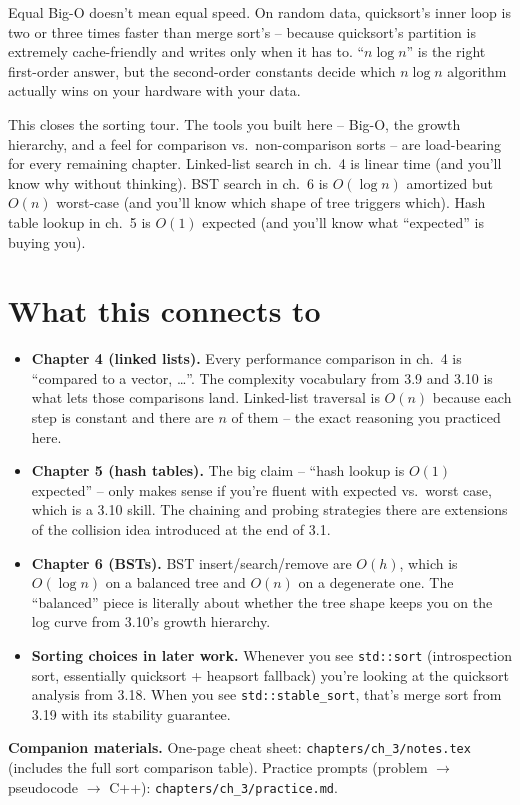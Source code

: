 \documentclass[11pt]{article}
\begin{document}
\begin{warnbox}
Equal Big-O doesn't mean equal speed. On random data, quicksort's
inner loop is two or three times faster than merge sort's --
because quicksort's partition is extremely cache-friendly and
writes only when it has to. ``$n \log n$'' is the right first-order
answer, but the second-order constants decide which $n \log n$
algorithm actually wins on your hardware with your data.
\end{warnbox}

\begin{ideabox}
This closes the sorting tour. The tools you built here -- Big-O, the
growth hierarchy, and a feel for comparison vs.\ non-comparison sorts --
are load-bearing for every remaining chapter. Linked-list search in
ch.~4 is linear time (and you'll know why without thinking). BST search
in ch.~6 is $O(\log n)$ amortized but $O(n)$ worst-case (and you'll know
which shape of tree triggers which). Hash table lookup in ch.~5 is $O(1)$
expected (and you'll know what ``expected'' is buying you).
\end{ideabox}

\section*{What this connects to}

\begin{notebox}
\begin{itemize}
    \item \textbf{Chapter 4 (linked lists).} Every performance comparison
    in ch.~4 is ``compared to a vector, \ldots''. The complexity
    vocabulary from 3.9 and 3.10 is what lets those comparisons land.
    Linked-list traversal is $O(n)$ because each step is constant and
    there are $n$ of them -- the exact reasoning you practiced here.
    \item \textbf{Chapter 5 (hash tables).} The big claim -- ``hash
    lookup is $O(1)$ expected'' -- only makes sense if you're fluent
    with expected vs.\ worst case, which is a 3.10 skill. The chaining
    and probing strategies there are extensions of the collision idea
    introduced at the end of 3.1.
    \item \textbf{Chapter 6 (BSTs).} BST insert/search/remove are
    $O(h)$, which is $O(\log n)$ on a balanced tree and $O(n)$ on a
    degenerate one. The ``balanced'' piece is literally about whether
    the tree shape keeps you on the log curve from 3.10's growth
    hierarchy.
    \item \textbf{Sorting choices in later work.} Whenever you see
    \texttt{std::sort} (introspection sort, essentially quicksort +
    heapsort fallback) you're looking at the quicksort analysis from
    3.18. When you see \texttt{std::stable\_sort}, that's merge sort
    from 3.19 with its stability guarantee.
\end{itemize}
\end{notebox}

\textbf{Companion materials.} One-page cheat sheet:
\texttt{chapters/ch\_3/notes.tex} (includes the full sort comparison
table). Practice prompts (problem $\to$ pseudocode $\to$ C++):
\texttt{chapters/ch\_3/practice.md}.
\end{document}

